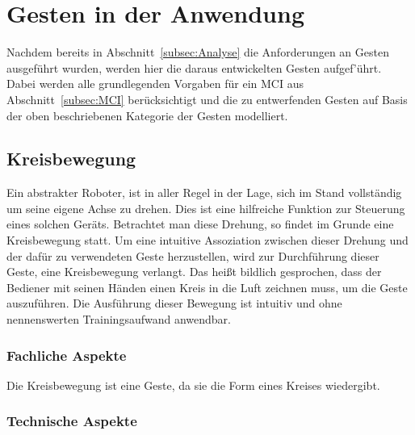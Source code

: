 \section{Gesten in der Anwendung}

Nachdem bereits in Abschnitt~\ref{subsec:Analyse} die Anforderungen an Gesten ausgef\"uhrt wurden, werden hier die daraus entwickelten Gesten aufgef'\"uhrt. Dabei werden alle grundlegenden Vorgaben f\"ur ein \gls{MCI} aus Abschnitt~\ref{subsec:MCI} ber\"ucksichtigt und die zu entwerfenden Gesten auf Basis der oben beschriebenen Kategorie der  Gesten modelliert.

\subsection{Kreisbewegung}
Ein abstrakter Roboter, ist in aller Regel in der Lage, sich im Stand vollst\"andig um seine eigene Achse zu drehen. Dies ist eine hilfreiche Funktion zur Steuerung eines solchen Ger\"ats. Betrachtet man diese Drehung, so findet im Grunde eine Kreisbewegung statt. Um eine intuitive Assoziation zwischen dieser Drehung und der daf\"ur zu verwendeten Geste herzustellen, wird zur Durchf\"uhrung dieser Geste, eine Kreisbewegung verlangt. Das hei\ss t bildlich gesprochen, dass der Bediener mit seinen H\"anden einen Kreis in die Luft zeichnen muss, um die Geste auszuf\"uhren.
\newline
Die Ausf\"uhrung dieser Bewegung ist intuitiv und ohne nennenswerten Trainingsaufwand anwendbar.

\subsubsection{Fachliche Aspekte}
Die Kreisbewegung ist eine  Geste, da sie die Form eines Kreises wiedergibt. 

\subsubsection{Technische Aspekte}


